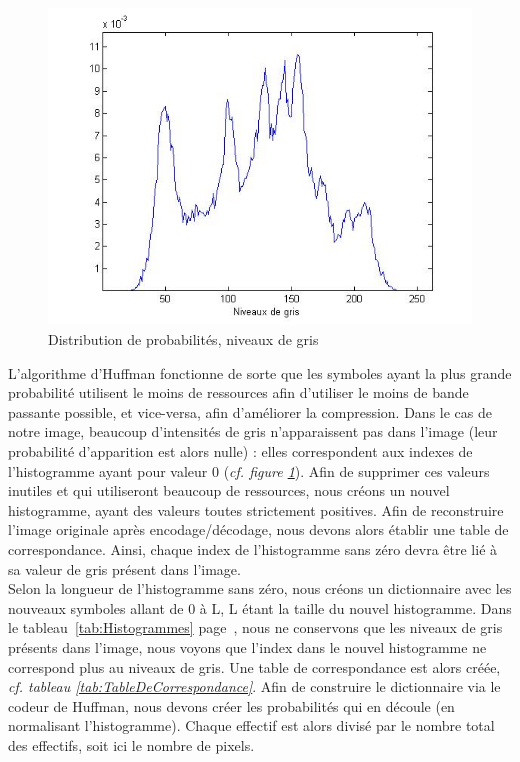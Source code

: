 \documentclass[a4paper, 12pt]{article}
\begin{document}
\begin{figure}[H]
\begin{center}
	 \includegraphics[scale=0.6]{../proba.jpg}
	 \caption{\label{probaGris} Distribution de probabilités, niveaux de gris}
\end{center}
\end{figure}

L'algorithme d'Huffman fonctionne de sorte que les symboles ayant la plus grande probabilité utilisent le moins de ressources afin d'utiliser le moins de bande passante possible, et vice-versa, afin d'améliorer la compression. Dans le cas de notre image, beaucoup d'intensités de gris n'apparaissent pas dans l'image (leur probabilité d'apparition est alors nulle) : elles correspondent aux indexes de l'histogramme ayant pour valeur 0 (\textit{cf. figure \ref{probaGris}}). Afin de supprimer ces valeurs inutiles et qui utiliseront beaucoup de ressources, nous créons un nouvel histogramme, ayant des valeurs toutes strictement positives. Afin de reconstruire l'image originale après encodage/décodage, nous devons alors établir une table de correspondance. Ainsi, chaque index de l'histogramme sans zéro devra être lié à sa valeur de gris présent dans l'image. \\

Selon la longueur de l'histogramme sans zéro, nous créons un dictionnaire avec les nouveaux symboles allant de 0 à L, L étant la taille du nouvel histogramme. Dans le tableau~\ref{tab:Histogrammes} page~\pageref{tab:Histogrammes}, nous ne conservons que les niveaux de gris présents dans l'image, nous voyons que l'index dans le nouvel histogramme ne correspond plus au niveaux de gris. Une table de correspondance est alors créée, \textit{cf. tableau \ref{tab:TableDeCorrespondance}}.
Afin de construire le dictionnaire via le codeur de Huffman, nous devons créer les probabilités qui en découle (en normalisant l'histogramme). Chaque effectif est alors divisé par le nombre total des effectifs, soit ici le nombre de pixels. \\
\end{document}
